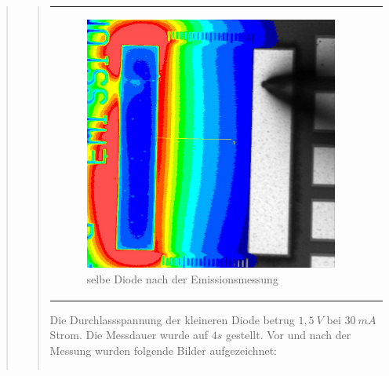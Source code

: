\begin{quote}
\begin{quote}
\begin{center}
\begin{tabular}{ll}
\begin{minipage}{0.6\textwidth}
                         \begin{figure}[H]
                            \label{fig:}
                            \includegraphics[scale=0.25, trim = 0cm 0cm 0cm
                            0cm,
                            clip]{./Emissionsbilder/drei/nach_Emissionsmessung_Distanz.jpg}
                            \caption{selbe Diode nach der Emissionsmessung}
                        \end{figure}
                   \vspace{-1.5em}
    
                    \end{minipage}
    
                \end{tabular}
                \end{center}
                
        \vspace{2em}
        
        Die Durchlassspannung der kleineren Diode betrug $1,5\ V$ bei $30\ mA$
        Strom. Die Messdauer wurde auf $4s$ gestellt. Vor und nach der Messung
        wurden folgende Bilder aufgezeichnet:
        
         
         \begin{center}
                \begin{tabular}{ll}
    

\end{tabular}
\end{center}
\end{quote}
\end{quote}
